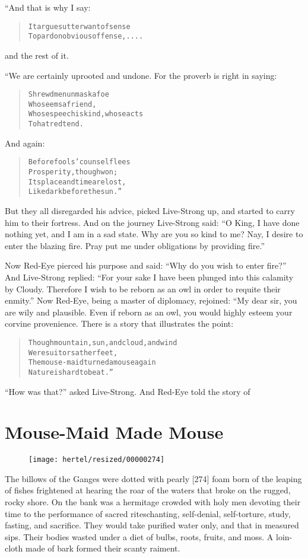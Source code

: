 \documentclass[article, twoside, 10pt]{memoir}
\renewenvironment{verbatim}{%
\begin{quote}%
\vskip -10pt%
\begin{alltt}\normalfont\small}{\end{alltt}%
\end{quote}%
\vskip -10pt
} %
\begin{document}
“And that is why I say:

\begin{verbatim}
It argues utter want of sense
To pardon obvious offense, . . . .
\end{verbatim}
and the rest of it.

“We are certainly uprooted and undone. For the proverb is right in
saying:

\begin{verbatim}
Shrewd men unmask a foe
    Who seems a friend,
Whose speech is kind, whose acts
    To hatred tend.
\end{verbatim}
And again:

\begin{verbatim}
Before fools' counsel flees
    Prosperity, though won;
Its place and time are lost,
    Like dark before the sun.”
\end{verbatim}
But they all disregarded his advice, picked Live-Strong up, and
started to carry him to their fortress. And on the journey
Live-Strong said:
``O King, I have done nothing yet, and I am in a sad state. Why are you so kind to me? Nay, I desire to enter the blazing fire. Pray put me under obligations by providing fire.''

Now Red-Eye pierced his purpose and said:
``Why do you wish to enter fire?'' And Live-Strong replied:
``For your sake I have been plunged into this calamity by Cloudy. Therefore I wish to be reborn as an owl in order to requite their enmity.''
Now Red-Eye, being a master of diplomacy, rejoined: “My dear sir,
you are wily and plausible. Even if reborn as an owl, you would
highly esteem your corvine provenience. There is a story that
illustrates the point:

\begin{verbatim}
Though mountain, sun, and cloud, and wind
    Were suitors at her feet,
The mouse-maid turned a mouse again{\textemdash}
    Nature is hard to beat.”
\end{verbatim}
``How was that?'' asked Live-Strong. And Red-Eye told the story of

\chapter{Mouse-Maid Made Mouse}

\begin{figure}[p]\texttt{[image: hertel/resized/00000274]}\end{figure}The billows of the Ganges were dotted with pearly [274] foam born
of the leaping of fishes frightened at hearing the roar of the
waters that broke on the rugged, rocky shore. On the bank was a
hermitage crowded with holy men devoting their time to the
performance of sacred rites{\textemdash}chanting, self-denial, self-torture,
study, fasting, and sacrifice. They would take purified water only,
and that in measured sips. Their bodies wasted under a diet of
bulbs, roots, fruits, and moss. A loin-cloth made of bark formed
their scanty raiment.
\end{document}
